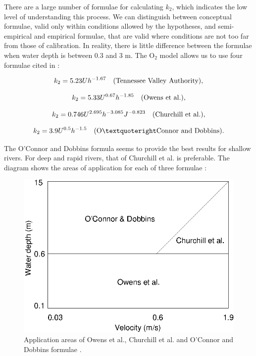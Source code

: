 There are a large number of formulae for calculating $k_2$,
which indicates the low level of understanding this process.
We can distinguish between conceptual formulae,
valid only within conditions allowed by the hypotheses,
and semi-empirical and empirical formulae,
that are valid where conditions are not too far from those of calibration.
In reality, there is little difference between the formulae when water depth
is between 0.3 and 3 m.
The O$_2$ model allows us to use four formulae cited in \cite{mccutcheon_wq_1989}:

\begin{equation}
  k_2 = 5.23 U h^{-1.67} \quad \rm{(Tennessee~Valley~Authority)},
\end{equation}

\begin{equation}
  k_2 = 5.33 U^{0.67} h^{-1.85} \quad \rm{(Owens~et~al.)},
\end{equation}

\begin{equation}
  k_2 = 0.746 U^{2.695} h^{-3.085} J^{-0.823} \quad \rm{(Churchill~et~al.)},
\end{equation}

\begin{equation}
  k_2 = 3.9 U^{0.5} h^{-1.5} \quad \rm{(O’Connor~and~Dobbins)}.
\end{equation}

The O’Connor and Dobbins formula seems to provide the best results for shallow rivers.
For deep and rapid rivers, that of Churchill et al. is preferable.
The diagram shows the areas of application for each of three formulae \cite{mccutcheon_wq_1989}:

\begin{figure}[H]
  \centering
  \includegraphics[scale=0.3]{graphics/validity_domain_reaeration_O2.png}
  \caption{Application areas of Owens et al., Churchill et al. and O'Connor
    and Dobbins formulae \cite{mccutcheon_wq_1989}.}
\end{figure}

